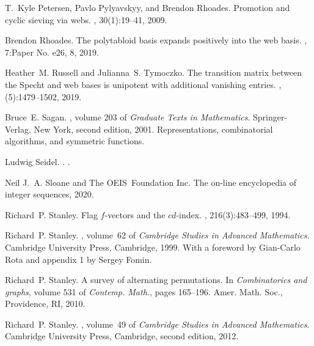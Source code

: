 \begin{thebibliography}{Dum74}
  T.~Kyle Petersen, Pavlo Pylyavskyy, and Brendon Rhoades.
  \newblock Promotion and cyclic sieving via webs.
  , 30(1):19--41, 2009.
  
  Brendon Rhoades.
  \newblock The polytabloid basis expands positively into the web basis.
  , 7:Paper No. e26, 8, 2019.
  
  Heather~M. Russell and Julianna~S. Tymoczko.
  \newblock The transition matrix between the {S}pecht and web bases is unipotent
    with additional vanishing entries.
  , (5):1479--1502, 2019.
  
  Bruce~E. Sagan.
  , volume 203 of {\em Graduate Texts in
    Mathematics}.
  \newblock Springer-Verlag, New York, second edition, 2001.
  \newblock Representations, combinatorial algorithms, and symmetric functions.
  
  Ludwig Seidel.
  .
  .
  
  Neil J.~A. Sloane and The OEIS~Foundation Inc.
  \newblock The on-line encyclopedia of integer sequences, 2020.
  
  Richard~P. Stanley.
  \newblock Flag {$f$}-vectors and the {$cd$}-index.
  , 216(3):483--499, 1994.
  
  Richard~P. Stanley.
  , volume~62 of {\em
    Cambridge Studies in Advanced Mathematics}.
  \newblock Cambridge University Press, Cambridge, 1999.
  \newblock With a foreword by Gian-Carlo Rota and appendix 1 by Sergey Fomin.
  
  Richard~P. Stanley.
  \newblock A survey of alternating permutations.
  \newblock In {\em Combinatorics and graphs}, volume 531 of {\em Contemp.
    Math.}, pages 165--196. Amer. Math. Soc., Providence, RI, 2010.
  
  Richard~P. Stanley.
  , volume~49 of {\em
    Cambridge Studies in Advanced Mathematics}.
  \newblock Cambridge University Press, Cambridge, second edition, 2012.
  
\end{thebibliography}